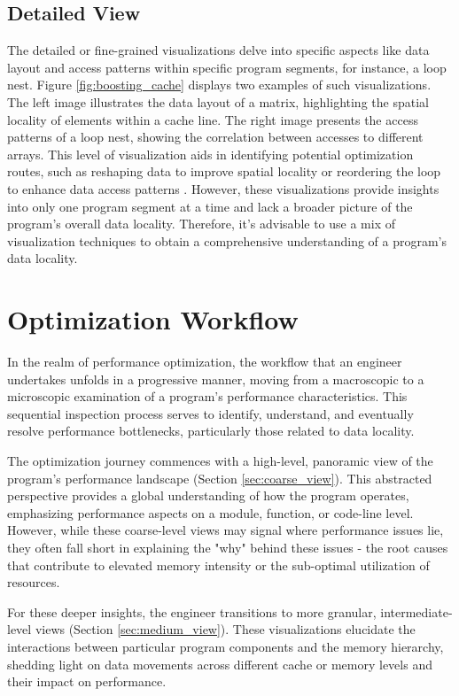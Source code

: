 \subsection{Detailed View}\label{sec:fine_view}
The detailed or fine-grained visualizations delve into specific aspects like data layout and access patterns within specific program segments, for instance, a loop nest. Figure \ref{fig:boosting_cache} displays two examples of such visualizations. The left image illustrates the data layout of a matrix, highlighting the spatial locality of elements within a cache line. The right image presents the access patterns of a loop nest, showing the correlation between accesses to different arrays. This level of visualization aids in identifying potential optimization routes, such as reshaping data to improve spatial locality or reordering the loop to enhance data access patterns \cite{schaad2022boosting}. However, these visualizations provide insights into only one program segment at a time and lack a broader picture of the program's overall data locality. Therefore, it's advisable to use a mix of visualization techniques to obtain a comprehensive understanding of a program's data locality.


\section{Optimization Workflow}\label{sec:optimization_workflow}
In the realm of performance optimization, the workflow that an engineer undertakes unfolds in a progressive manner, moving from a macroscopic to a microscopic examination of a program's performance characteristics. This sequential inspection process serves to identify, understand, and eventually resolve performance bottlenecks, particularly those related to data locality.

The optimization journey commences with a high-level, panoramic view of the program's performance landscape (Section \ref{sec:coarse_view}). This abstracted perspective provides a global understanding of how the program operates, emphasizing performance aspects on a module, function, or code-line level. However, while these coarse-level views may signal where performance issues lie, they often fall short in explaining the "why" behind these issues - the root causes that contribute to elevated memory intensity or the sub-optimal utilization of resources.

For these deeper insights, the engineer transitions to more granular, intermediate-level views (Section \ref{sec:medium_view}). These visualizations elucidate the interactions between particular program components and the memory hierarchy, shedding light on data movements across different cache or memory levels and their impact on performance.

